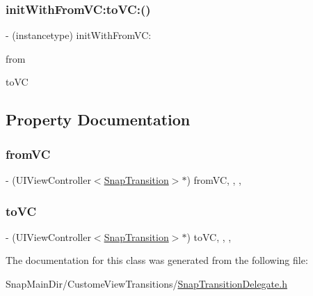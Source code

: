 \subsubsection{\texorpdfstring{init\+With\+From\+V\+C\+:to\+V\+C\+:()}{initWithFromVC:toVC:()}}
{\footnotesize\ttfamily -\/ (instancetype) init\+With\+From\+V\+C\+: \begin{DoxyParamCaption}\item[{(U\+I\+View\+Controller$<$ \hyperlink{protocol_snap_transition-p}{Snap\+Transition} $>$ $\ast$)}]{from }\item[{toVC:(U\+I\+View\+Controller$<$ \hyperlink{protocol_snap_transition-p}{Snap\+Transition} $>$ $\ast$)}]{to\+VC }\end{DoxyParamCaption}}



\subsection{Property Documentation}
\hypertarget{interface_snap_transition_delegate_aa316a4eac25d32766f8cad197a44e4f0}{}\label{interface_snap_transition_delegate_aa316a4eac25d32766f8cad197a44e4f0} 
\subsubsection{\texorpdfstring{from\+VC}{fromVC}}
{\footnotesize\ttfamily -\/ (U\+I\+View\+Controller$<$\hyperlink{protocol_snap_transition-p}{Snap\+Transition}$>$$\ast$) from\+VC\hspace{0.3cm}{\ttfamily [read]}, {\ttfamily [write]}, {\ttfamily [nonatomic]}, {\ttfamily [weak]}}

\hypertarget{interface_snap_transition_delegate_a67d9c8e445f2d245ace64fc1866e5b48}{}\label{interface_snap_transition_delegate_a67d9c8e445f2d245ace64fc1866e5b48} 
\subsubsection{\texorpdfstring{to\+VC}{toVC}}
{\footnotesize\ttfamily -\/ (U\+I\+View\+Controller$<$\hyperlink{protocol_snap_transition-p}{Snap\+Transition}$>$$\ast$) to\+VC\hspace{0.3cm}{\ttfamily [read]}, {\ttfamily [write]}, {\ttfamily [nonatomic]}, {\ttfamily [weak]}}



The documentation for this class was generated from the following file\+:\begin{DoxyCompactItemize}
\item 
Snap\+Main\+Dir/\+Custome\+View\+Transitions/\hyperlink{_snap_transition_delegate_8h}{Snap\+Transition\+Delegate.\+h}\end{DoxyCompactItemize}
